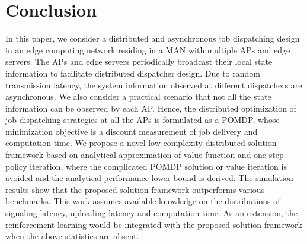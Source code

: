\section{Conclusion}
\label{sec:conclusion}
In this paper, we consider a distributed and asynchronous job dispatching design in an edge computing network residing in a MAN with multiple APs and edge servers.
The APs and edge servers periodically broadcast their local state information to facilitate distributed dispatcher design.
Due to random transmission latency, the system information observed at different dispatchers are asynchronous.
We also consider a practical scenario that not all the state information can be observed by each AP.
Hence, the distributed optimization of job dispatching strategies at all the APs is formulated as a POMDP, whose minimization objective is a discount measurement of job delivery and computation time.
We propose a novel low-complexity distributed solution framework based on analytical approximation of value function and one-step policy iteration, where the complicated POMDP solution or value iteration is avoided and the analytical performance lower bound is derived.
The simulation results show that the proposed solution framework outperforms various benchmarks.
This work assumes available knowledge on the distributions of signaling latency, uploading latency and computation time.
As an extension, the reinforcement learning would be integrated with the proposed solution framework when the above statistics are absent.
